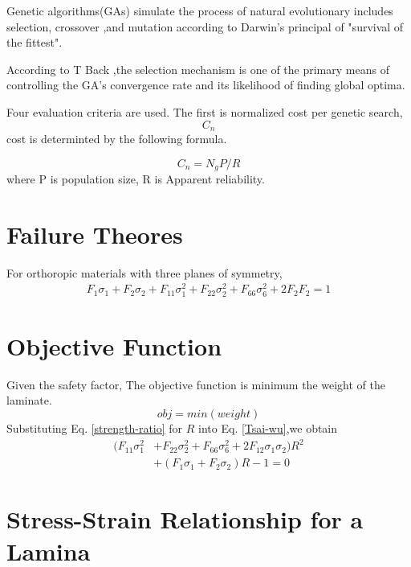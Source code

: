 \documentclass[smallextended]{svjour3}       %
\begin{document}

Genetic algorithms(GAs) simulate the process of natural evolutionary includes selection, crossover ,and mutation  according to Darwin's principal of "survival of the fittest".

According to T Back \cite{back1994selective},the selection mechanism is one of the primary means of controlling the GA's convergence rate and its
likelihood of finding global optima.


Four evaluation criteria are used. 
The first is normalized cost per genetic search, $$C_{n}$$
cost is determinted by the following formula.

$$C_{n} = N_{g}P/R$$
where P is population size, R is Apparent reliability.


\section{Failure Theores}

For orthoropic materials with three planes of symmetry, 
\begin{equation}\label{Tsai-wu}
	\begin{split}
		F_1\sigma_1+F_2\sigma_2+F_{11}\sigma_1^2+F_{22}\sigma_2^2+F_{66}\sigma_6^2+2F_2F_2=1
    \end{split}
\end{equation}

\section{Objective Function}

Given the safety factor, The objective function is minimum the weight of the laminate.
\begin{equation*}\label{strength-ratio}
	obj=min(weight) 
\end{equation*}
Substituting Eq. \ref{strength-ratio} for $R$ into Eq. \ref{Tsai-wu},we obtain
\begin{equation*}
	\begin{split}
		(F_{11}\sigma_1^2&+F_{22}\sigma_2^2+F_{66}\sigma_6^2+2F_{12}\sigma_1\sigma_2)R^2 \\
						 &+(F_1\sigma_1+F_2\sigma_2)R-1=0
	\end{split}
\end{equation*}


\section{Stress-Strain Relationship for a Lamina}
\end{document}

